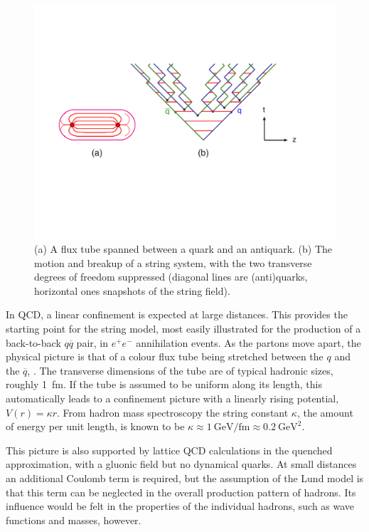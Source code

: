\begin{figure}
\includegraphics[width=\textwidth]{hadronization/stringone.pdf} 
\caption{(a) A flux tube spanned between a quark and an antiquark.
(b) The motion and breakup of a string system, with the two 
transverse degrees of freedom suppressed (diagonal lines are 
(anti)quarks, horizontal ones snapshots of the string field).
\label{fig:stringone}}
\end{figure}

In QCD, a linear confinement is expected at large distances. This
provides the starting point for the string model, most easily
illustrated for the production of a back-to-back $q\overline{q}$ 
pair, \eg in $e^+e^-$ annihilation events. As the partons move 
apart, the physical picture is that of a colour flux tube being 
stretched between the $q$ and the $\overline{q}$, 
. The transverse dimensions of the tube 
are of typical hadronic sizes, roughly 1~fm. If the tube is assumed 
to be uniform along its length, this automatically leads to a 
confinement picture with a linearly rising potential, 
$V(r) = \kappa r$. From hadron mass spectroscopy the string 
constant $\kappa$, \ie the amount of energy per unit length, 
is known to be 
$\kappa \approx 1~\mathrm{GeV/fm} \approx 0.2~\mathrm{GeV}^2$.

This picture is also supported by lattice QCD calculations in the 
quenched approximation, \ie with a gluonic field but no dynamical 
quarks. At small distances an additional Coulomb term is required,
but the assumption of the Lund model is that this term can be 
neglected in the overall production pattern of hadrons. Its 
influence would be felt in the properties of the individual  
hadrons, such as wave functions and masses, however.

